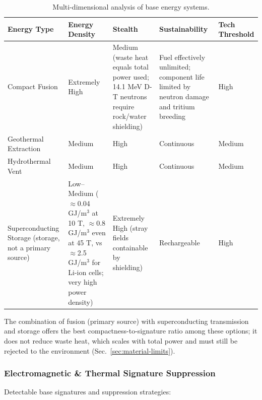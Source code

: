 \documentclass[aps,prd,twocolumn,superscriptaddress,nofootinbib]{revtex4-2}
\begin{document}
\begin{table}[htbp]
\caption{Multi-dimensional analysis of base energy systems.}
\label{tab:energy-matrix}
\footnotesize
\begin{tabular}{P{0.172\textwidth}P{0.197\textwidth}P{0.203\textwidth}P{0.184\textwidth}P{0.092\textwidth}}
\toprule
Energy Type & Energy Density & Stealth & Sustainability & Tech Threshold \\
\midrule
Compact Fusion & Extremely High & Medium (waste heat equals total power used; 14.1 MeV D-T neutrons require rock/water shielding) & Fuel effectively unlimited; component life limited by neutron damage and tritium breeding & High \\
Geothermal Extraction & Medium & High & Continuous & Medium \\
Hydrothermal Vent & Medium & High & Continuous & Medium \\
Superconducting Storage (storage, not a primary source) & Low--Medium ($\approx$0.04 GJ/m$^{3}$ at 10 T, $\approx$0.8 GJ/m$^{3}$ even at 45 T, vs $\approx$2.5 GJ/m$^{3}$ for Li-ion cells; very high power density) & Extremely High (stray fields containable by shielding) & Rechargeable & High \\
\bottomrule
\end{tabular}
\end{table}

The combination of fusion (primary source) with superconducting transmission and storage offers the best compactness-to-signature ratio among these options; it does not reduce waste heat, which scales with total power and must still be rejected to the environment (Sec.~\ref{sec:material-limits}).

\subsubsection{Electromagnetic \& Thermal Signature Suppression}\label{sec:signature-suppression}

Detectable base signatures and suppression strategies:
\end{document}
